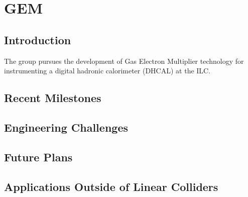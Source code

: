 \section{GEM}
\subsection{Introduction}
The group pursues the development of Gas Electron Multiplier technology for instrumenting a digital hadronic calorimeter (DHCAL) at the ILC.
\subsection{Recent Milestones}
\subsection{Engineering Challenges}
\subsection{Future Plans}
\subsection{Applications Outside of Linear Colliders}
